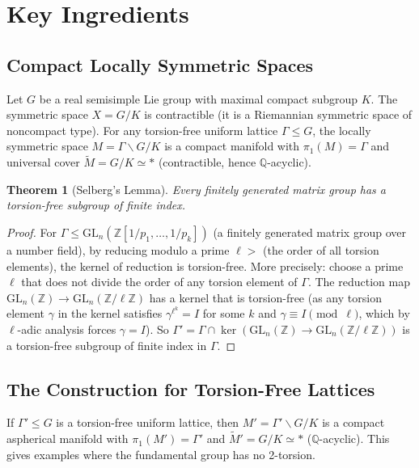 \documentclass[12pt]{article}
\newtheorem{theorem}{Theorem}
\theoremstyle{definition}
\begin{document}
\section{Key Ingredients}

\subsection{Compact Locally Symmetric Spaces}

Let $G$ be a real semisimple Lie group with maximal compact subgroup $K$. The symmetric space $X = G/K$ is contractible (it is a Riemannian symmetric space of noncompact type). For any torsion-free uniform lattice $\Gamma\leq G$, the locally symmetric space $M = \Gamma\backslash G/K$ is a compact manifold with $\pi_1(M) = \Gamma$ and universal cover $\tilde{M} = G/K\simeq *$ (contractible, hence $\mathbb{Q}$-acyclic).

\begin{theorem}[Selberg's Lemma]\label{thm:selberg}
Every finitely generated matrix group has a torsion-free subgroup of finite index.
\end{theorem}

\begin{proof}
For $\Gamma\leq\mathrm{GL}_n(\mathbb{Z}[1/p_1,\ldots,1/p_k])$ (a finitely generated matrix group over a number field), by reducing modulo a prime $\ell > $ (the order of all torsion elements), the kernel of reduction is torsion-free. More precisely: choose a prime $\ell$ that does not divide the order of any torsion element of $\Gamma$. The reduction map $\mathrm{GL}_n(\mathbb{Z})\to\mathrm{GL}_n(\mathbb{Z}/\ell\mathbb{Z})$ has a kernel that is torsion-free (as any torsion element $\gamma$ in the kernel satisfies $\gamma^{\ell^k} = I$ for some $k$ and $\gamma\equiv I\pmod{\ell}$, which by $\ell$-adic analysis forces $\gamma = I$). So $\Gamma' = \Gamma\cap\ker(\mathrm{GL}_n(\mathbb{Z})\to\mathrm{GL}_n(\mathbb{Z}/\ell\mathbb{Z}))$ is a torsion-free subgroup of finite index in $\Gamma$.
\end{proof}

\subsection{The Construction for Torsion-Free Lattices}

If $\Gamma'\leq G$ is a torsion-free uniform lattice, then $M' = \Gamma'\backslash G/K$ is a compact aspherical manifold with $\pi_1(M') = \Gamma'$ and $\tilde{M}' = G/K\simeq *$ ($\mathbb{Q}$-acyclic). This gives examples where the fundamental group has no 2-torsion.
\end{document}
